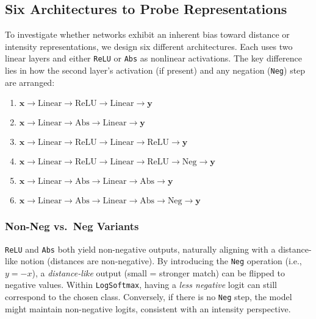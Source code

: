 \subsection{Six Architectures to Probe Representations}
To investigate whether networks exhibit an inherent bias toward distance or intensity representations, we design six different architectures. Each uses two linear layers and either \texttt{ReLU} or \texttt{Abs} as nonlinear activations. The key difference lies in how the second layer's activation (if present) and any negation (\texttt{Neg}) step are arranged:
\begin{enumerate}
    \item \(\mathbf{x} \rightarrow \text{Linear} \rightarrow \text{ReLU} \rightarrow \text{Linear} \rightarrow \mathbf{y}\)
    \item \(\mathbf{x} \rightarrow \text{Linear} \rightarrow \text{Abs} \rightarrow \text{Linear} \rightarrow \mathbf{y}\)
    \item \(\mathbf{x} \rightarrow \text{Linear} \rightarrow \text{ReLU} \rightarrow \text{Linear} \rightarrow \text{ReLU} \rightarrow \mathbf{y}\)
    \item \(\mathbf{x} \rightarrow \text{Linear} \rightarrow \text{ReLU} \rightarrow \text{Linear} \rightarrow \text{ReLU} \rightarrow \text{Neg} \rightarrow \mathbf{y}\)
    \item \(\mathbf{x} \rightarrow \text{Linear} \rightarrow \text{Abs} \rightarrow \text{Linear} \rightarrow \text{Abs} \rightarrow \mathbf{y}\)
    \item \(\mathbf{x} \rightarrow \text{Linear} \rightarrow \text{Abs} \rightarrow \text{Linear} \rightarrow \text{Abs} \rightarrow \text{Neg} \rightarrow \mathbf{y}\)
\end{enumerate}

\subsubsection{Non-Neg vs.\ Neg Variants}
\texttt{ReLU} and \texttt{Abs} both yield non-negative outputs, naturally aligning with a distance-like notion (distances are non-negative). By introducing the \texttt{Neg} operation (i.e., \(y = -x\)), a \emph{distance-like} output (small = stronger match) can be flipped to negative values. Within \texttt{LogSoftmax}, having a \emph{less negative} logit can still correspond to the chosen class. Conversely, if there is no \texttt{Neg} step, the model might maintain non-negative logits, consistent with an intensity perspective.

